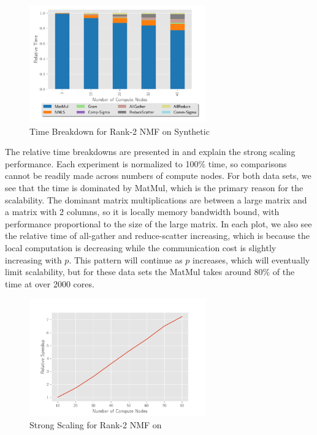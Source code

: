 \begin{figure}
\begin{center}
\includegraphics[height=2in, width=\columnwidth]{plots/synthetic_rank2_strongscaling.pdf}
\caption{Time Breakdown for Rank-2 NMF on Synthetic}
\label{fig:synrank2strongscaling}
\end{center}
\end{figure}

The relative time breakdowns are presented in  and explain the strong scaling performance.
Each experiment is normalized to 100\% time, so comparisons cannot be readily made across numbers of compute nodes. 
For both data sets, we see that the time is dominated by MatMul, which is the primary reason for the scalability.
The dominant matrix multiplications are between a large matrix and a matrix with 2 columns, so it is locally memory bandwidth bound, with performance proportional to the size of the large matrix.
In each plot, we also see the relative time of all-gather and reduce-scatter increasing, which is because the local computation is decreasing while the communication cost is slightly increasing with $p$.
This pattern will continue as $p$ increases, which will eventually limit scalability, but for these data sets the MatMul takes around 80\% of the time at over 2000 cores.

\begin{figure}
\begin{center}
\includegraphics[height=2in, width=\columnwidth]{plots/realworld_rank2_speedup.pdf}
\caption{Strong Scaling for Rank-2 NMF on \image{}}
\label{fig:rwrank2speedup}
\end{center}
\end{figure}


